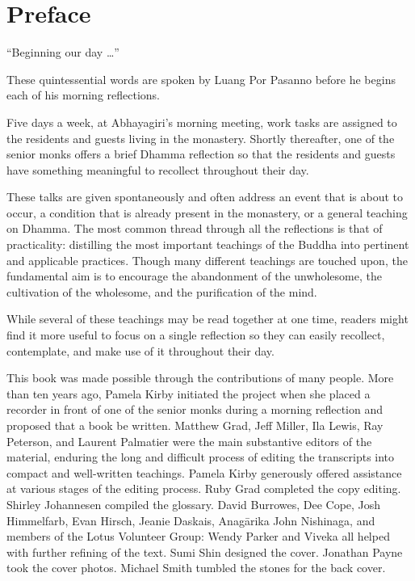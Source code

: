 \chapter*{Preface}

``Beginning our day \ldots{}''

These quintessential words are spoken by Luang Por Pasanno before he
begins each of his morning reflections.

Five days a week, at Abhayagiri's morning meeting, work tasks are
assigned to the residents and guests living in the monastery. Shortly
thereafter, one of the senior monks offers a brief Dhamma reflection so
that the residents and guests have something meaningful to recollect
throughout their day.

These talks are given spontaneously and often address an event that is
about to occur, a condition that is already present in the monastery, or
a general teaching on Dhamma. The most common thread through all the
reflections is that of practicality: distilling the most important
teachings of the Buddha into pertinent and applicable practices. Though
many different teachings are touched upon, the fundamental aim is to
encourage the abandonment of the unwholesome, the cultivation of the
wholesome, and the purification of the mind.

While several of these teachings may be read together at one time,
readers might find it more useful to focus on a single reflection so
they can easily recollect, contemplate, and make use of it throughout
their day.

This book was made possible through the contributions of many people.
More than ten years ago, Pamela Kirby initiated the project when she
placed a recorder in front of one of the senior monks during a morning
reflection and proposed that a book be written. Matthew Grad, Jeff
Miller, Ila Lewis, Ray Peterson, and Laurent Palmatier were the main
substantive editors of the material, enduring the long and difficult
process of editing the transcripts into compact and well-written
teachings. Pamela Kirby generously offered assistance at various stages
of the editing process. Ruby Grad completed the copy editing. Shirley
Johannesen compiled the glossary. David Burrowes, Dee Cope, Josh
Himmelfarb, Evan Hirsch, Jeanie Daskais, Anagārika John Nishinaga, and
members of the \mbox{Lotus} \mbox{Volunteer} \mbox{Group}: Wendy Parker
and Viveka all helped with further refining of the text. Sumi Shin
designed the cover.  Jonathan Payne took the cover photos. Michael Smith
tumbled the stones for the back cover.

